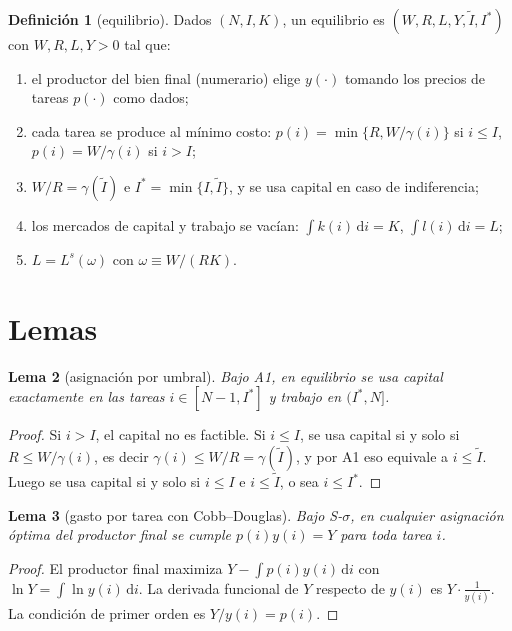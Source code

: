 \documentclass[11pt,a4paper]{article}
\numberwithin{equation}{section}
\theoremstyle{definition}
\newtheorem{definicion}{Definición}[section]
\theoremstyle{plain}
\newtheorem{lema}[definicion]{Lema}
\theoremstyle{remark}
\newcommand{\It}{\tilde I}
\newcommand{\Is}{I^{*}}
\newcommand{\dd}{\,\mathrm{d}}
\begin{document}
\begin{definicion}[equilibrio]\label{def:eq}
Dados $(N,I,K)$, un equilibrio es $(W,R,L,Y,\It,\Is)$ con $W,R,L,Y>0$ tal que:
\begin{enumerate}[nosep,label=(E\arabic*)]
  \item el productor del bien final (numerario) elige $y(\cdot)$ tomando los precios de tareas $p(\cdot)$ como dados;
  \item cada tarea se produce al mínimo costo: $p(i)=\min\{R,W/\gamma(i)\}$ si $i\le I$, $p(i)=W/\gamma(i)$ si $i>I$;
  \item $W/R=\gamma(\It)$ e $\Is=\min\{I,\It\}$, y se usa capital en caso de indiferencia;
  \item los mercados de capital y trabajo se vacían: $\int k(i)\dd i=K$, $\int l(i)\dd i=L$;
  \item $L=L^s(\omega)$ con $\omega\equiv W/(RK)$.
\end{enumerate}
\end{definicion}

\section{Lemas}

\begin{lema}[asignación por umbral]\label{lem:umbral}
Bajo \textsf{A1}, en equilibrio se usa capital exactamente en las tareas $i\in[N-1,\Is]$ y trabajo en $(\Is,N]$.
\end{lema}
\begin{proof}
Si $i>I$, el capital no es factible. Si $i\le I$, se usa capital si y solo si $R\le W/\gamma(i)$, es decir
$\gamma(i)\le W/R=\gamma(\It)$, y por \textsf{A1} eso equivale a $i\le\It$. Luego se usa capital si y solo si
$i\le I$ e $i\le\It$, o sea $i\le\Is$.
\end{proof}

\begin{lema}[gasto por tarea con Cobb--Douglas]\label{lem:gasto}
Bajo \textsf{S-$\sigma$}, en cualquier asignación óptima del productor final se cumple $p(i)y(i)=Y$ para toda tarea $i$.
\end{lema}
\begin{proof}
El productor final maximiza $Y-\int p(i)y(i)\dd i$ con $\ln Y=\int\ln y(i)\dd i$. La derivada funcional de $Y$
respecto de $y(i)$ es $Y\cdot\frac{1}{y(i)}$. La condición de primer orden es $Y/y(i)=p(i)$.
\end{proof}
\end{document}
